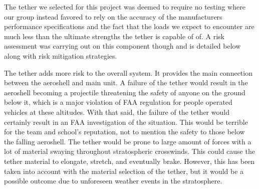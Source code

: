 \indent\indent The tether we selected for this project was deemed to require no testing where our group instead favored to rely on the accuracy of the manufacturers performance specifications and the fact that the loads we expect to encounter are much less than the ultimate strengths the tether is capable of of. A risk assessment was carrying out on this component though and is detailed below along with risk mitigation strategies. 

\begin{table}[H]
\caption{\label{tab:tether_failure} Tether Failure Modes \& Probabilities}
\centering

\end{table}

\indent\indent The tether adds more risk to the overall system. It provides the main connection between the aeroshell and main unit. A failure of the tether would result in the aeroshell becoming a projectile threatening the safety of anyone on the ground below it, which is a major violation of FAA regulation for people operated vehicles at these altitudes. With that said, the failure of the tether would certainly result in an FAA investigation of the situation. This would be terrible for the team and school's reputation, not to mention the safety to those below the falling aeroshell. The tether would be prone to large amount of forces with a lot of material swaying throughout stratospheric crosswinds. This could cause the tether material to elongate, stretch, and eventually brake. However, this has been taken into account with the material selection of the tether, but it would be a possible outcome due to unforeseen weather events in the stratosphere.

